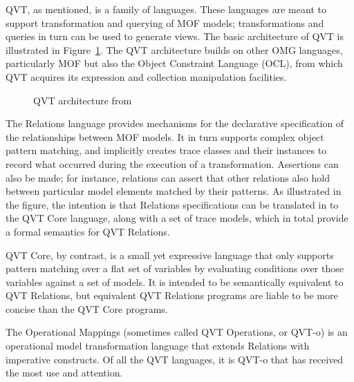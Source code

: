 QVT, as mentioned, is a family of languages. These languages are meant to support transformation and querying of MOF models; transformations and queries in turn can be used to generate views. The basic architecture of QVT is illustrated in Figure~\ref{fig:qvt}. The QVT architecture builds on other OMG languages, particularly MOF but also the Object Constraint Language (OCL), from which QVT acquires its expression and collection manipulation facilities.

\begin{figure}[htbp]
\label{fig:qvt}
\caption{QVT architecture from \cite{QVT-specification}}
\end{figure}

The Relations language provides mechanisms for the declarative specification of the relationships between MOF models. It in turn supports complex object pattern matching, and implicitly creates trace classes and their instances to record what occurred during the execution of a transformation. Assertions can also be made; for instance, relations can assert that other relations also hold between particular model elements matched by their patterns. As illustrated in the figure, the intention is that Relations specifications can be translated in to the QVT Core language, along with a set of trace models, which in total provide a formal semantics for QVT Relations.

QVT Core, by contrast, is a small yet expressive language that only supports pattern matching over a flat set of variables by evaluating conditions
over those variables against a set of models. It is intended to be semantically equivalent to QVT Relations, but equivalent QVT Relations programs are liable to be more concise than the QVT Core programs.

The Operational Mappings (sometimes called QVT Operations, or QVT-o) is an operational model transformation language that extends Relations with imperative constructs. Of all the QVT languages, it is QVT-o that has received the most use and attention.

